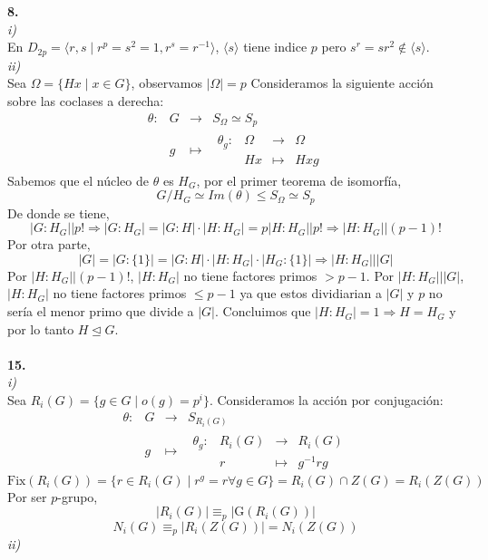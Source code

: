 \documentclass{article}
\begin{document}
\\
\\
\textbf{8.}\\
\textit{i)}\\
En $D_{2p} = \langle r, s \mid r^p = s^2=1, r^s=r^{-1}\rangle$, $\langle s \rangle$ tiene indice $p$ pero $s^r = sr^2\notin \langle s \rangle $.\\
\textit{ii)}\\
Sea $\Omega= \{Hx \mid x\in G\}$, observamos $|\Omega |=p$ Consideramos la siguiente acción sobre las coclases a derecha:
$$
\begin{array}{crcl}
 \theta : & G & \longrightarrow & S_\Omega \simeq S_p\\
& g & \longmapsto     & \begin{array}{crcl}
\theta_g : & \Omega & \longrightarrow & \Omega \\
& Hx & \longmapsto     & Hxg
\end{array}
\end{array}
$$
Sabemos que el núcleo de $\theta$ es $H_G$, por el primer teorema de isomorfía,
$$
G/H_G \simeq Im(\theta)\le S_\Omega \simeq S_p
$$
De donde se tiene,
$$
|G:H_G| \Big| p! \Rightarrow |G:H_G|=|G:H|\cdot |H:H_G| = p |H:H_G|\Big| p! \Rightarrow |H:H_G|\Big| (p-1)!
$$
Por otra parte,
$$
|G| = |G:\{1\}| = |G:H|\cdot|H:H_G|\cdot|H_G:\{1\}| \Rightarrow |H:H_G|\Big| |G|
$$
Por $|H:H_G|\Big| (p-1)!$, $|H:H_G|$ no tiene factores primos $>p-1$. Por $|H:H_G|\Big| |G|$, $|H:H_G|$ no tiene factores primos $\le p-1$ ya que estos dividiarian a $|G|$ y $p$ no sería el menor primo que divide a $|G|$. Concluimos que $|H:H_G|= 1 \Rightarrow H = H_G$ y por lo tanto $H\trianglelefteq  G$.
\\
\\
\textbf{15.}\\
\textit{i)}\\
Sea $R_i(G)=\{g\in G \mid o(g) = p^i\}$. Consideramos la acción por conjugación:
$$
\begin{array}{crcl}
\theta : & G & \longrightarrow & S_{R_i(G)} \\
& g & \longmapsto     & \begin{array}{crcl}
\theta_g : & R_i(G) & \longrightarrow & R_i(G) \\
& r & \longmapsto     & g^{-1}rg
\end{array}
\end{array}
$$
$$
\text{Fix}(R_i(G)) = \{r \in R_i(G)\mid r^g=r \forall g \in G\} = R_i(G) \cap Z(G) = R_i(Z(G))
$$
Por ser $p$-grupo,
$$
|R_i(G)| \equiv_p | \text{G}(R_i(G))|
$$
$$
N_i(G) \equiv_p |R_i(Z(G))| = N_i(Z(G))
$$
\textit{ii)}\\
\end{document}
